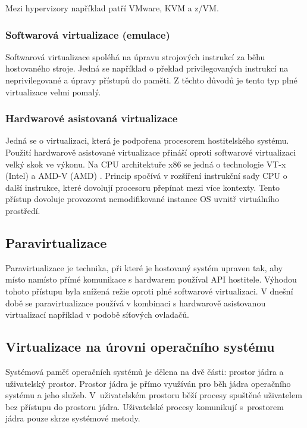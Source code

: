 Mezi hypervizory například patří VMware, KVM a z/VM.

\subsubsection{Softwarová virtualizace (emulace)}

Softwarová virtualizace spoléhá na úpravu strojových instrukcí za běhu hostovaného stroje.
Jedná se například o překlad privilegovaných instrukcí na neprivilegované a úpravy přístupů do paměti.
Z těchto důvodů je tento typ plné virtualizace velmi pomalý.

\subsubsection{Hardwarové asistovaná virtualizace}

Jedná se o virtualizaci, která je podpořena procesorem hostitelského systému.
Použití hardwarově asistované virtualizace přináší oproti softwarové virtualizaci velký skok ve výkonu.
Na CPU architektuře x86 se jedná o technologie VT-x (Intel) \cite{vt_x} a AMD-V (AMD) \cite{amd_v}.
Princip spočívá v rozšíření instrukční sady CPU o další instrukce, které dovolují procesoru přepínat mezi více kontexty.
Tento přístup dovoluje provozovat nemodifikované instance OS uvnitř virtuálního prostředí.

\subsection{Paravirtualizace}

Paravirtualizace je technika, při které je hostovaný systém upraven tak, aby místo namísto přímé komunikace s hardwarem používal API hostitele.
Výhodou tohoto přístupu byla snížená režie oproti plné softwarové virtualizaci.
V dnešní době se paravirtualizace používá v kombinaci s hardwarově asistovanou virtualizací například v podobě síťových ovladačů.


\subsection{Virtualizace na úrovni operačního systému}

Systémová paměť operačních systémů je dělena na dvě části: prostor jádra a uživatelský prostor.
Prostor jádra je přímo využíván pro běh jádra operačního systému a jeho služeb.
V~uživatelském prostoru běží procesy spuštěné uživatelem bez přístupu do prostoru jádra.
Uživatelské procesy komunikují s~prostorem jádra pouze skrze systémové metody.
\cite{kernel_space}

